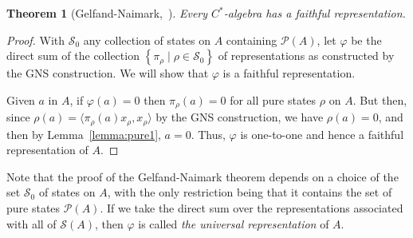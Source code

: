 \documentclass[11pt,a4paper]{report}
\theoremstyle{plain}
\newtheorem{thm}{Theorem}
\theoremstyle{definition}
\newcommand{\1}{\mathbbm{1}}
\renewcommand{\phi}{\varphi}
\renewcommand{\S}{\mathscr{S}}
\renewcommand{\P}[1]{\mathscr{P}(#1)}
\begin{document}
\clearpage
\begin{thm}[Gelfand-Naimark,~{\cite[4.5.6]{kadison83}}] \label{thm:gn}
	Every $C^\ast$-algebra has a faithful representation.
\end{thm}
\begin{proof}
	With $\S_0$ any collection of states on $A$ containing $\P{A}$, let $\phi$ be 
	the direct sum of the collection $\left\{\pi_\rho \mid \rho\in\S_0\right\}$ of 
	representations as constructed by the GNS construction. We will show that $\phi$ 
	is a faithful representation.

	
	Given $a$ in $A$, if $\phi(a)=0$ then $\pi_\rho(a)=0$ for all pure states $\rho$ 
	on $A$. But then, since $\rho(a)=\langle \pi_\rho (a) x_\rho, x_\rho \rangle$ by 
	the GNS construction, we have $\rho(a)=0$, and then by Lemma~\ref{lemma:pure1}, 
	$a=0$. Thus, $\phi$ is one-to-one and hence a faithful representation of $A$.
\end{proof}

Note that the proof of the Gelfand-Naimark theorem depends on a choice of the 
set $\S_0$ of states on $A$, with the only restriction being that it contains 
the set of pure states $\P A$. If we take the direct sum over the 
representations associated with all of $\S (A)$, then $\phi$ is called \emph{the 
universal representation} of $A$.
\end{document}
